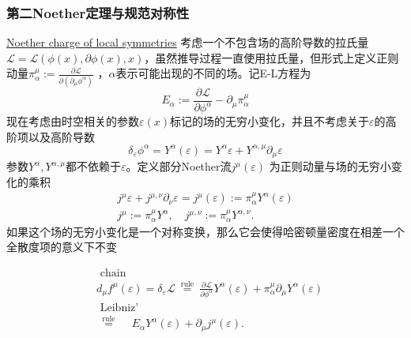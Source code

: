 \documentclass[10pt,openany]{book}
\theoremstyle{thmstyle} %
\theoremstyle{defstyle} %
\theoremstyle{prostyle} %
\begin{document}
\subsubsection{第二Noether定理与规范对称性}
\href{https://physics.stackexchange.com/questions/66092/noether-charge-of-local-symmetries}{Noether charge of local symmetries}
考虑一个不包含场的高阶导数的拉氏量$ \mathcal{L}=\mathcal{L}(\phi(x), \partial \phi(x), x) $，虽然推导过程一直使用拉氏量，但形式上定义正则动量$ \pi_\alpha^\mu:=\frac{\partial \mathcal{L}}{\partial\left(\partial_\mu \phi^\alpha\right)} $ ，$ \alpha $表示可能出现的不同的场。记E-L方程为
\begin{equation}
  E_\alpha:=\frac{\partial \mathcal{L}}{\partial \phi^\alpha}-\partial_\mu \pi_\alpha^\mu
\end{equation}  
现在考虑由时空相关的参数$ \varepsilon(x) $标记的场的无穷小变化，并且不考虑关于$ \varepsilon $的高阶项以及高阶导数
\begin{equation}
  \delta_{\varepsilon} \phi^\alpha=Y^\alpha(\varepsilon)=Y^\alpha \varepsilon+Y^{\alpha, \mu} \partial_\mu \varepsilon
\end{equation}
参数$ Y^\alpha,Y^{\alpha, \mu} $都不依赖于$ \varepsilon $。定义部分Noether流$ j^\mu(\varepsilon) $ 为正则动量与场的无穷小变化的乘积
\begin{equation}
  \begin{gathered}
    j^\mu \varepsilon+j^{\mu, \nu} \partial_\nu \varepsilon=j^\mu(\varepsilon):=\pi_\alpha^\mu Y^\alpha(\varepsilon) \\
    j^\mu:=\pi_\alpha^\mu Y^\alpha, \quad j^{\mu, \nu}:=\pi_\alpha^\mu Y^{\alpha, \nu} .
    \end{gathered}
\end{equation}
如果这个场的无穷小变化是一个对称变换，那么它会使得哈密顿量密度在相差一个全散度项的意义下不变

\begin{equation}
  \begin{aligned}
  & \text { chain } \\
  & d_\mu f^\mu(\varepsilon)=\delta_{\varepsilon} \mathcal{L} \stackrel{\text { rule }}{=} \frac{\partial \mathcal{L}}{\partial \phi^\alpha} Y^\alpha(\varepsilon)+\pi_\alpha^\mu \partial_\mu Y^\alpha(\varepsilon) \\
  & \text { Leibniz' } \\
  & \stackrel{\text { rule }}{=} \quad E_\alpha Y^\alpha(\varepsilon)+\partial_\mu j^\mu(\varepsilon) . \\
  &
  \end{aligned}
  \label{7}
  \end{equation}
    
\end{document}
